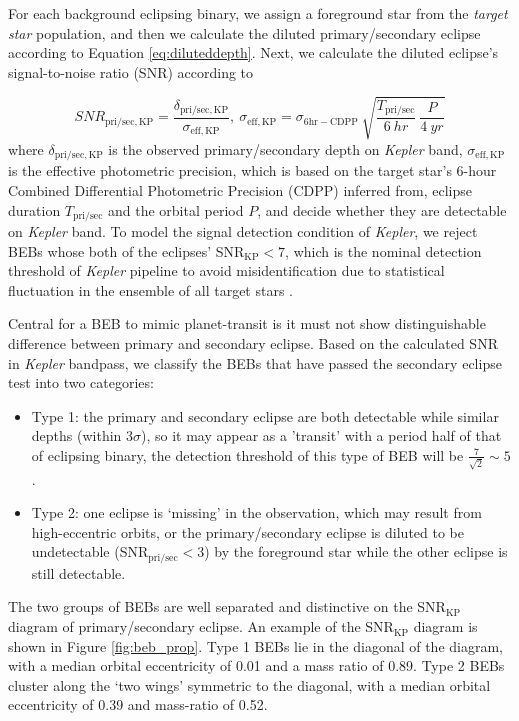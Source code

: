 \documentclass{aastex63}
\begin{document}
     For each background eclipsing binary, we assign a foreground star from the \emph{target star} population, and then we calculate the diluted primary/secondary eclipse according to Equation \ref{eq:diluteddepth}. Next, we calculate the diluted eclipse's signal-to-noise ratio (SNR) according to
     
     \begin{equation}
     \label{eq:snr}
         SNR_\mathrm{pri/sec,KP} = \frac{\delta_\mathrm{pri/sec,KP}}{\sigma_\mathrm{eff, KP}},~\sigma_\mathrm{eff, KP}= \sigma_\mathrm{6hr-CDPP}~\sqrt{\frac{T_\mathrm{pri/sec}}{6~hr}~\frac{P}{4~yr}}
     \end{equation}
     where $\delta_\mathrm{pri/sec,KP}$ is the observed primary/secondary depth on \emph{Kepler} band, $\sigma_\mathrm{eff, KP}$ is the effective photometric precision, which is based on the target star's 6-hour Combined Differential Photometric Precision (CDPP) inferred from, eclipse duration $T_\mathrm{pri/sec}$ and the orbital period $P$, and decide whether they are detectable on \emph{Kepler} band. To model the signal detection condition of \emph{Kepler}, we reject BEBs whose both of the eclipses' SNR$_\mathrm{KP}<7$, which is the nominal detection threshold of \emph{Kepler} pipeline to avoid misidentification due to statistical fluctuation in the ensemble of all target stars \citep{2010ApJ...713L..87J}. 
     
     Central for a BEB to mimic planet-transit is it must not show distinguishable difference between primary and secondary eclipse. Based on the calculated SNR in \emph{Kepler} bandpass, we classify the BEBs that have passed the secondary eclipse test into two categories:
    
    \begin{itemize}
        \item Type 1: the primary and secondary eclipse are both detectable while similar depths (within $3\sigma$), so it may appear as a 'transit' with a period half of that of eclipsing binary, the detection threshold of this type of BEB will be $\frac{7}{\sqrt{2}}\sim 5$.
        \item Type 2: one eclipse is `missing' in the observation, which may result from high-eccentric orbits, or the primary/secondary eclipse is diluted to be undetectable (SNR$_\mathrm{pri/sec} < 3$) by the foreground star while the other eclipse is still detectable.
    \end{itemize}
    
    The two groups of BEBs are well separated and distinctive on the SNR$_\mathrm{KP}$ diagram of primary/secondary eclipse. An example of the SNR$_\mathrm{KP}$ diagram is shown in Figure \ref{fig:beb_prop}. Type 1 BEBs lie in the diagonal of the diagram, with a median orbital eccentricity of 0.01 and a mass ratio of 0.89. Type 2 BEBs cluster along the `two wings' symmetric to the diagonal, with a median orbital eccentricity of 0.39 and mass-ratio of 0.52.
\end{document}
